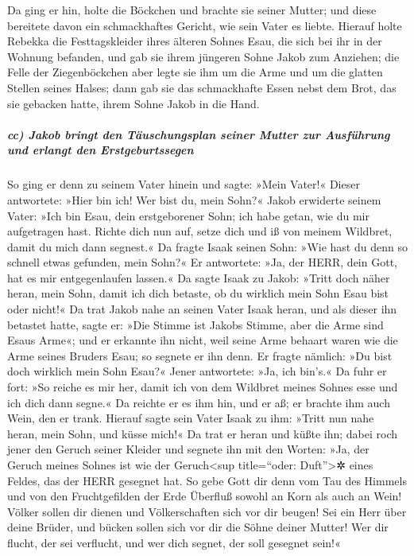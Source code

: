  Da ging er hin, holte die Böckchen und brachte sie
seiner Mutter; und diese bereitete davon ein schmackhaftes Gericht, wie
sein Vater es liebte.  Hierauf holte Rebekka die
Festtagskleider ihres älteren Sohnes Esau, die sich bei ihr in der
Wohnung befanden, und gab sie ihrem jüngeren Sohne Jakob zum Anziehen;
 die Felle der Ziegenböckchen aber legte sie ihm um die
Arme und um die glatten Stellen seines Halses;  dann gab
sie das schmackhafte Essen nebst dem Brot, das sie gebacken hatte, ihrem
Sohne Jakob in die Hand.

\hypertarget{cc-jakob-bringt-den-tuxe4uschungsplan-seiner-mutter-zur-ausfuxfchrung-und-erlangt-den-erstgeburtssegen}{%
\subparagraph{cc) Jakob bringt den Täuschungsplan seiner Mutter zur
Ausführung und erlangt den
Erstgeburtssegen}\label{cc-jakob-bringt-den-tuxe4uschungsplan-seiner-mutter-zur-ausfuxfchrung-und-erlangt-den-erstgeburtssegen}}

 So ging er denn zu seinem Vater hinein und sagte: »Mein
Vater!« Dieser antwortete: »Hier bin ich! Wer bist du, mein Sohn?«
 Jakob erwiderte seinem Vater: »Ich bin Esau, dein
erstgeborener Sohn; ich habe getan, wie du mir aufgetragen hast. Richte
dich nun auf, setze dich und iß von meinem Wildbret, damit du mich dann
segnest.«  Da fragte Isaak seinen Sohn: »Wie hast du denn
so schnell etwas gefunden, mein Sohn?« Er antwortete: »Ja, der HERR,
dein Gott, hat es mir entgegenlaufen lassen.«  Da sagte
Isaak zu Jakob: »Tritt doch näher heran, mein Sohn, damit ich dich
betaste, ob du wirklich mein Sohn Esau bist oder nicht!« 
Da trat Jakob nahe an seinen Vater Isaak heran, und als dieser ihn
betastet hatte, sagte er: »Die Stimme ist Jakobs Stimme, aber die Arme
sind Esaus Arme«;  und er erkannte ihn nicht, weil seine
Arme behaart waren wie die Arme seines Bruders Esau; so segnete er ihn
denn.  Er fragte nämlich: »Du bist doch wirklich mein
Sohn Esau?« Jener antwortete: »Ja, ich bin's.«  Da fuhr
er fort: »So reiche es mir her, damit ich von dem Wildbret meines Sohnes
esse und ich dich dann segne.« Da reichte er es ihm hin, und er aß; er
brachte ihm auch Wein, den er trank.  Hierauf sagte sein
Vater Isaak zu ihm: »Tritt nun nahe heran, mein Sohn, und küsse mich!«
 Da trat er heran und küßte ihn; dabei roch jener den
Geruch seiner Kleider und segnete ihn mit den Worten: »Ja, der Geruch
meines Sohnes ist wie der Geruch\textless sup title=``oder:
Duft''\textgreater✲ eines Feldes, das der HERR gesegnet hat.
 So gebe Gott dir denn vom Tau des Himmels und von den
Fruchtgefilden der Erde Überfluß sowohl an Korn als auch an Wein!
 Völker sollen dir dienen und Völkerschaften sich vor dir
beugen! Sei ein Herr über deine Brüder, und bücken sollen sich vor dir
die Söhne deiner Mutter! Wer dir flucht, der sei verflucht, und wer dich
segnet, der soll gesegnet sein!«

